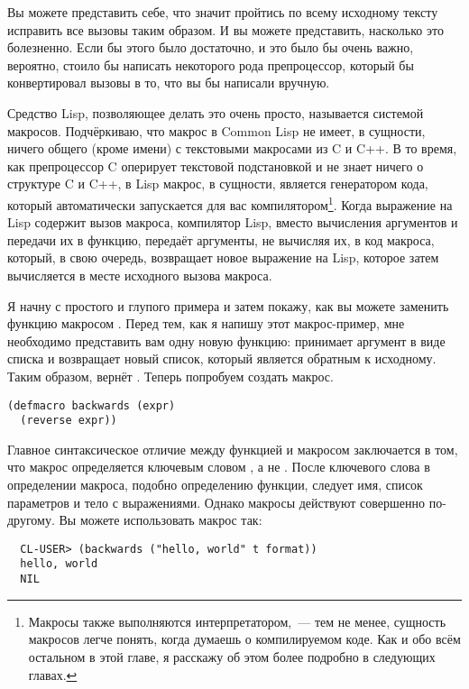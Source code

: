 Вы можете представить себе, что значит пройтись по всему исходному тексту исправить все
вызовы  таким образом. И вы можете представить, насколько это болезненно. Если
бы этого было достаточно, и это было бы очень важно, вероятно, стоило бы написать
некоторого рода препроцессор, который бы конвертировал вызовы  в то, что вы бы
написали вручную.

Средство Lisp, позволяющее делать это очень просто, называется системой
макросов. Подчёркиваю, что макрос в Common Lisp не имеет, в сущности, ничего общего (кроме
имени) с текстовыми макросами из C и C++. В то время, как препроцессор C оперирует
текстовой подстановкой и не знает ничего о структуре C и C++, в Lisp макрос, в сущности,
является генератором кода, который автоматически запускается для вас
компилятором\footnote{Макросы также выполняются интерпретатором,~--- тем не менее,
  сущность макросов легче понять, когда думаешь о компилируемом коде. Как и обо всём
  остальном в этой главе, я расскажу об этом более подробно в следующих главах.}. Когда
выражение на Lisp содержит вызов макроса, компилятор Lisp, вместо вычисления аргументов и
передачи их в функцию, передаёт аргументы, не вычисляя их, в код макроса, который, в свою
очередь, возвращает новое выражение на Lisp, которое затем вычисляется в месте исходного
вызова макроса.

Я начну с простого и глупого примера и затем покажу, как вы можете заменить функцию
 макросом . Перед тем, как я напишу этот макрос-пример, мне
необходимо представить вам одну новую функцию:  принимает аргумент в виде
списка и возвращает новый список, который является обратным к исходному. Таким образом,
 вернёт . Теперь попробуем создать макрос.

\begin{lstlisting}
(defmacro backwards (expr)
  (reverse expr))
\end{lstlisting}

Главное синтаксическое отличие между функцией и макросом заключается в том, что макрос
определяется ключевым словом , а не . После ключевого слова в
определении макроса, подобно определению функции, следует имя, список параметров и тело с
выражениями. Однако макросы действуют совершенно по-другому. Вы можете использовать макрос
так:

\begin{verbatim}
  CL-USER> (backwards ("hello, world" t format))
  hello, world
  NIL
\end{verbatim}

